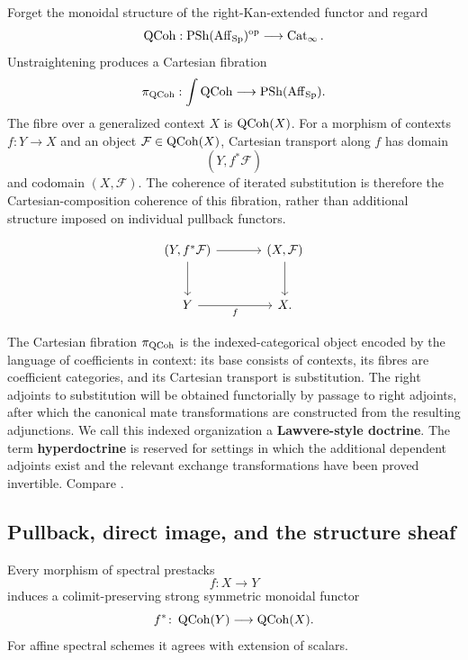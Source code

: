 \begin{construction}
\label{con:qcoh-coefficient-fibration}
Forget the monoidal structure of the right-Kan-extended functor and regard
\[
    \operatorname{QCoh}
    :
    \operatorname{PSh}(\operatorname{Aff}_{\operatorname{Sp}})^{\mathrm{op}}
    \longrightarrow
    \operatorname{Cat}_\infty.
\]
Unstraightening produces a Cartesian fibration
\[
    \pi_{\operatorname{QCoh}}
    :
    \int\operatorname{QCoh}
    \longrightarrow
    \operatorname{PSh}(\operatorname{Aff}_{\operatorname{Sp}}).
\]
The fibre over a generalized context \(X\) is \(\operatorname{QCoh}(X)\). For a
morphism of contexts \(f:Y\to X\) and an object
\(\mathcal F\in\operatorname{QCoh}(X)\), Cartesian transport along \(f\) has domain
\[
    (Y,f^*\mathcal F)
\]
and codomain \((X,\mathcal F)\). The coherence of iterated substitution is
therefore the Cartesian-composition coherence of this fibration, rather than
additional structure imposed on individual pullback functors.
\end{construction}

\[
\begin{tikzcd}[column sep=large, row sep=large]
    (Y,f^*\mathcal F)
        \arrow[r]
        \arrow[d]
    &
    (X,\mathcal F)
        \arrow[d]
    \\
    Y
        \arrow[r, "f"']
    &
    X.
\end{tikzcd}
\]


\begin{remark}
\label{rem:lawvere-style-indexed-semantics}
The Cartesian fibration \(\pi_{\operatorname{QCoh}}\) is the indexed-categorical object
encoded by the language of coefficients in context: its base consists of
contexts, its fibres are coefficient categories, and its Cartesian transport
is substitution. The right adjoints to substitution will be obtained
functorially by passage to right adjoints, after which the canonical mate
transformations are constructed from the resulting adjunctions. We call this
indexed organization a \textbf{Lawvere-style doctrine}. The term
\textbf{hyperdoctrine} is reserved for settings in which the additional
dependent adjoints exist and the relevant exchange transformations have been
proved invertible. Compare \cite{JacobsCategoricalLogic}.
\end{remark}

\subsection{Pullback, direct image, and the structure sheaf}

\begin{proposition}
\label{prop:qcoh-pullback}
Every morphism of spectral prestacks
\[
    f
    \colon
    X
    \longrightarrow
    Y
\]
induces a colimit-preserving strong symmetric monoidal functor
\[
    f^*
    \colon
    \operatorname{QCoh}(Y)
    \longrightarrow
    \operatorname{QCoh}(X).
\]
For affine spectral schemes it agrees with extension of scalars.
\end{proposition}


